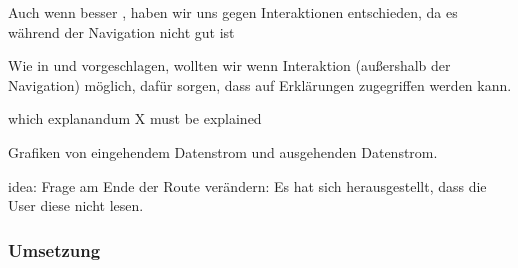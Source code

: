 Auch wenn besser \cite{riveiro_thats_2021}, haben wir uns gegen Interaktionen entschieden, da es während der Navigation nicht gut ist

Wie in \cite{chazette_end-users_nodate} und \cite{wang_integration_2020} vorgeschlagen, wollten wir wenn Interaktion (außershalb der Navigation) möglich, dafür sorgen, dass auf Erklärungen zugegriffen werden kann.

which explanandum X must be explained \cite{kohl_explainability_2019}

Grafiken von eingehendem Datenstrom und ausgehenden Datenstrom.

idea: Frage am Ende der Route verändern: Es hat sich herausgestellt, dass die User diese nicht lesen.

\subsubsection{Umsetzung}